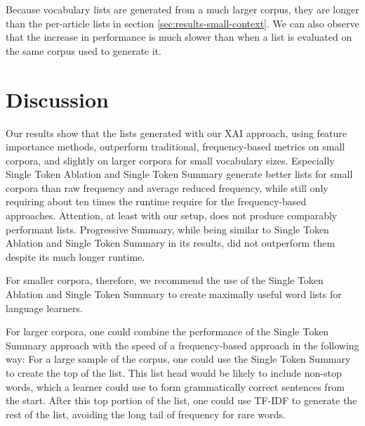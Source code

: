 Because vocabulary lists are generated from a much larger corpus, they are longer than the per-article lists in section \ref{sec:results-small-context}.
We can also observe that the increase in performance is much slower than when a list is evaluated on the same corpus used to generate it.


\section{Discussion} \label{sec:results-discussion}
Our results show that the lists generated with our XAI approach, using feature importance methods, outperform traditional, frequency-based metrics on small corpora, and slightly on larger corpora for small vocabulary sizes.
Especially Single Token Ablation and Single Token Summary generate better lists for small corpora than raw frequency and average reduced frequency, while still only requiring about ten times the runtime require for the frequency-based approaches.
Attention, at least with our setup, does not produce comparably performant lists.
Progressive Summary, while being similar to Single Token Ablation and Single Token Summary in its results, did not outperform them despite its much longer runtime.

For smaller corpora, therefore, we recommend the use of the Single Token Ablation and Single Token Summary to create maximally useful word lists for language learners.

For larger corpora, one could combine the performance of the Single Token Summary approach with the speed of a frequency-based approach in the following way:
For a large sample of the corpus, one could use the Single Token Summary to create the top of the list.
This list head would be likely to include non-stop words, which a learner could use to form grammatically correct sentences from the start.
After this top portion of the list, one could use TF-IDF to generate the rest of the list, avoiding the long tail of frequency for rare words.







